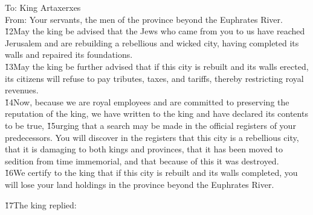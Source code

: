 \begin{poetry}
\poeml To: King Artaxerxes \\
\poeml From: Your servants, the men of the province beyond the Euphrates River. \\
\poeml \v{12}May the king be advised that the Jews who came from you to us have reached Jerusalem and are rebuilding a rebellious and wicked city, having completed its walls and repaired its foundations. \\
\poeml \v{13}May the king be further advised that if this city is rebuilt and its walls erected, its citizens will refuse to pay tributes, taxes, and tariffs, thereby restricting royal revenues. \\
\poeml \v{14}Now, because we are royal employees and are committed to preserving the reputation of the king, we have written to the king and have declared its contents to be true, \v{15}urging that a search may be made in the official registers of your predecessors. You will discover in the registers that this city is a rebellious city, that it is damaging to both kings and provinces, that it has been moved to sedition from time immemorial, and that because of this it was destroyed. \\
\poeml \v{16}We certify to the king that if this city is rebuilt and its walls completed, you will lose your land holdings in the province beyond the Euphrates River.
\end{poetry}

\v{17}The king replied:

